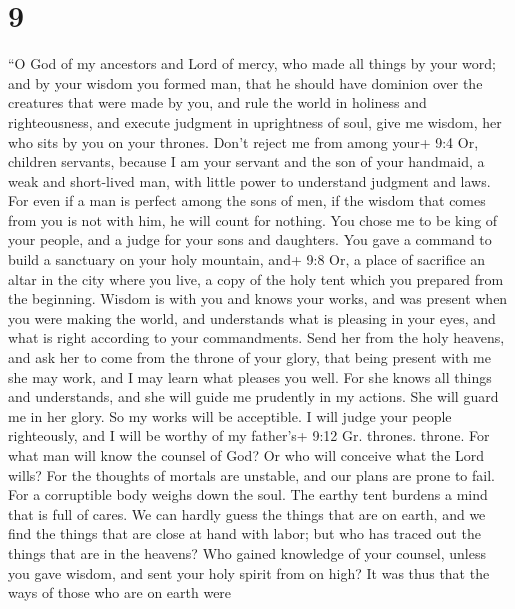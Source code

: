 \hypertarget{section-7}{%
\section{9}\label{section-7}}

 ``O God of my ancestors and Lord of mercy, who made all
things by your word;  and by your wisdom you formed man,
that he should have dominion over the creatures that were made by you,
 and rule the world in holiness and righteousness, and
execute judgment in uprightness of soul,  give me wisdom,
her who sits by you on your thrones. Don't reject me from among your+
9:4 Or, children servants,  because I am your servant and
the son of your handmaid, a weak and short-lived man, with little power
to understand judgment and laws.  For even if a man is
perfect among the sons of men, if the wisdom that comes from you is not
with him, he will count for nothing.  You chose me to be
king of your people, and a judge for your sons and daughters.
 You gave a command to build a sanctuary on your holy
mountain, and+ 9:8 Or, a place of sacrifice an altar in the city where
you live, a copy of the holy tent which you prepared from the beginning.
 Wisdom is with you and knows your works, and was present
when you were making the world, and understands what is pleasing in your
eyes, and what is right according to your commandments. 
Send her from the holy heavens, and ask her to come from the throne of
your glory, that being present with me she may work, and I may learn
what pleases you well.  For she knows all things and
understands, and she will guide me prudently in my actions. She will
guard me in her glory.  So my works will be acceptible. I
will judge your people righteously, and I will be worthy of my father's+
9:12 Gr. thrones. throne.  For what man will know the
counsel of God? Or who will conceive what the Lord wills? 
For the thoughts of mortals are unstable, and our plans are prone to
fail.  For a corruptible body weighs down the soul. The
earthy tent burdens a mind that is full of cares.  We can
hardly guess the things that are on earth, and we find the things that
are close at hand with labor; but who has traced out the things that are
in the heavens?  Who gained knowledge of your counsel,
unless you gave wisdom, and sent your holy spirit from on high?
 It was thus that the ways of those who are on earth were

